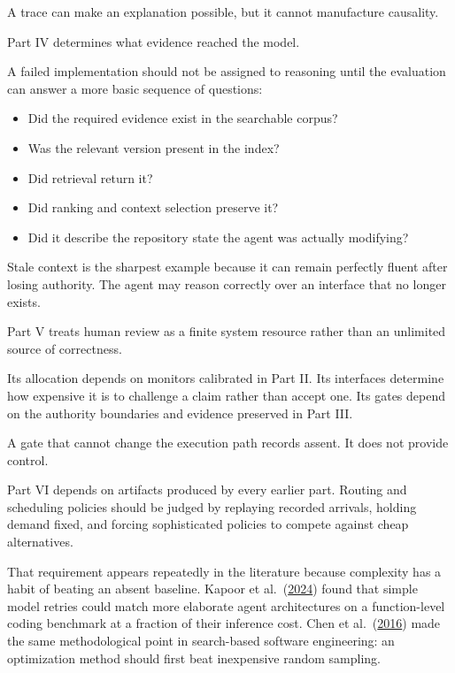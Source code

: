 A trace can make an explanation possible, but it cannot manufacture causality.


Part IV determines what evidence reached the model.

A failed implementation should not be assigned to reasoning until the evaluation can answer a more basic sequence of questions:

\begin{itemize}
\tightlist
\item
  Did the required evidence exist in the searchable corpus?
\item
  Was the relevant version present in the index?
\item
  Did retrieval return it?
\item
  Did ranking and context selection preserve it?
\item
  Did it describe the repository state the agent was actually modifying?
\end{itemize}

Stale context is the sharpest example because it can remain perfectly fluent after losing authority. The agent may reason correctly over an interface that no longer exists.

Part V treats human review as a finite system resource rather than an unlimited source of correctness.

Its allocation depends on monitors calibrated in Part II. Its interfaces determine how expensive it is to challenge a claim rather than accept one. Its gates depend on the authority boundaries and evidence preserved in Part III.

A gate that cannot change the execution path records assent. It does not provide control.

Part VI depends on artifacts produced by every earlier part. Routing and scheduling policies should be judged by replaying recorded arrivals, holding demand fixed, and forcing sophisticated policies to compete against cheap alternatives.

That requirement appears repeatedly in the literature because complexity has a habit of beating an absent baseline. Kapoor et al.~(\href{https://arxiv.org/abs/2407.01502}{2024}) found that simple model retries could match more elaborate agent architectures on a function-level coding benchmark at a fraction of their inference cost. Chen et al.~(\href{https://arxiv.org/abs/1608.07617}{2016}) made the same methodological point in search-based software engineering: an optimization method should first beat inexpensive random sampling.

